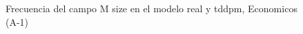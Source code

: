 \begin{figure}[H]
    \centering
    
    \caption{Frecuencia del campo M size en el modelo real y tddpm, Economicos (A-1)}
    \label{frecuency-M Size-tddpm_mlp}
\end{figure}
